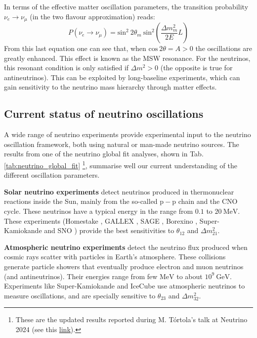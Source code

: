 In terms of the effective matter oscillation parameters, the transition probability $\nu_{e} \rightarrow \nu_{\mu}$ (in the two flavour approximation) reads:
\begin{equation}
	P(\nu_{e} \rightarrow \nu_{\mu}) = \mathrm{sin}^{2}~2\theta_{m} ~ \mathrm{sin}^{2}\left(\frac{\Delta m_{m}^{2}}{2E}L\right)
\end{equation}
From this last equation one can see that, when $\mathrm{cos}~2\theta = A > 0$ the oscillations are greatly enhanced. This effect is known as the MSW resonance. For the neutrinos, this resonant condition is only satisfied if $\Delta m^{2}>0$ (the opposite is true for antineutrinos). This can be exploited by long-baseline experiments, which can gain sensitivity to the neutrino mass hierarchy through matter effects.

\subsection{Current status of neutrino oscillations}

A wide range of neutrino experiments provide experimental input to the neutrino oscillation framework, both using natural or man-made neutrino sources. The results from one of the neutrino global fit analyses, shown in Tab. \ref{tab:neutrino_global_fit} \footnote{These are the updated results reported during M. T\'{o}rtola's talk at Neutrino 2024 (see this \href{https://agenda.infn.it/event/37867/contributions/233956/attachments/121839/178002/MTortola-Neutrino2024.pdf}{link}).}, summarise well our current understanding of the different oscillation parameters.

\textbf{Solar neutrino experiments} detect neutrinos produced in thermonuclear reactions inside the Sun, mainly from the so-called $\mathrm{p}-\mathrm{p}$ chain and the CNO cycle. These neutrinos have a typical energy in the range from $0.1$ to $20 \ \mathrm{MeV}$. These experiments (Homestake \cite{Homestake1998}, GALLEX \cite{GALLEX2010}, SAGE \cite{SAGE2009}, Borexino \cite{Borexino2011}, Super-Kamiokande \cite{Super-Kamiokande2005} and SNO \cite{SNO2011}) provide the best sensitivities to $\theta_{12}$ and $\Delta m^{2}_{21}$.

\textbf{Atmospheric neutrino experiments} detect the neutrino flux produced when cosmic rays scatter with particles in Earth's atmosphere. These collisions generate particle showers that eventually produce electron and muon neutrinos (and antineutrinos). Their energies range from few $\mathrm{MeV}$ to about $10^{9} \ \mathrm{GeV}$. Experiments like Super-Kamiokande \cite{Super-Kamiokande2017} and IceCube \cite{IceCube2017} use atmospheric neutrinos to measure oscillations, and are specially sensitive to $\theta_{23}$ and $\Delta m^{2}_{32}$.


